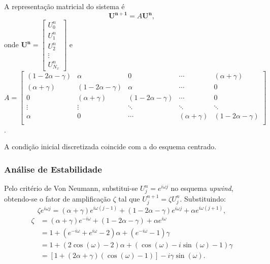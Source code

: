\documentclass[12pt, a4paper]{article}
\renewcommand{\bf}[1]{\mathbf{#1}}
\begin{document}
    A representação matricial do sistema é
    \begin{equation}
        \bf{U^{n+1}} = A\bf{U^n},
    \end{equation}
    onde $\bf{U^n} = \begin{bmatrix}
        U_0^n \\ U_1^n \\ U_2^n \\ \vdots \\ U_{N_x}^n
    \end{bmatrix}$ e $A = \begin{bmatrix}
        (1-2\alpha-\gamma) & \alpha & 0 & \cdots & (\alpha+\gamma)\\
        (\alpha+\gamma) & (1-2\alpha-\gamma) & \alpha & \cdots & 0\\
        0 & (\alpha+\gamma) & (1-2\alpha-\gamma) & \cdots & 0\\
        \vdots & \vdots & \ddots & \ddots & \ddots\\
        \alpha & 0 & \cdots & (\alpha+\gamma) & (1-2\alpha-\gamma)\\
    \end{bmatrix}$.

    \vspace{.4cm}

    A condição inicial discretizada coincide com a do esquema centrado.

    \subsubsection{Análise de Estabilidade}\label{sec:est}

    Pelo critério de Von Neumann, substitui-se $U_j^n = e^{i\omega j}$ no esquema \textit{upwind}, obtendo-se o fator de amplificação $\zeta$ tal que $U_j^{n+1} = \zeta U_j^n$. Substituindo:
    \[\zeta e^{i\omega j} = (\alpha+\gamma) e^{i\omega(j-1)} + (1-2\alpha-\gamma)e^{i\omega j} + \alpha e^{i\omega(j+1)},\]
    \[\begin{split}
        \zeta &= (\alpha+\gamma) e^{-i\omega} + (1-2\alpha-\gamma) + \alpha e^{i\omega}\\
        &= 1 + (e^{-i\omega}+e^{i\omega} - 2)\alpha + (e^{-i\omega} - 1)\gamma\\
        &= 1 + (2\cos(\omega) - 2)\alpha + (\cos(\omega)-i\sin(\omega) - 1)\gamma\\
        &= [1+(2\alpha+\gamma)(\cos(\omega)-1)] - i \gamma\sin(\omega).
    \end{split}\]
\end{document}
